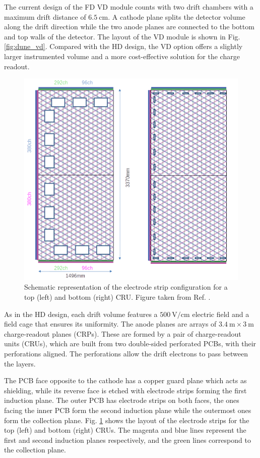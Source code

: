 The current design of the FD VD module counts with two drift chambers with a maximum drift distance of $6.5~\mathrm{cm}$. A cathode plane splits the detector volume along the drift direction while the two anode planes are connected to the bottom and top walls of the detector. The layout of the VD module is shown in Fig. \ref{fig:dune_vd}. Compared with the HD design, the VD option offers a slightly larger instrumented volume and a more cost-effective solution for the charge readout.

\begin{figure}[t]
	\centering
	\includegraphics[width=0.70\linewidth]{Images/DUNE/FD/3V_anode_layout}
	\caption[Schematic representation of the electrode strip configuration for a top and bottom CRU.]{Schematic representation of the electrode strip configuration for a top (left) and bottom (right) CRU. Figure taken from Ref. \cite{DUNEVDTDR}.}
	\label{fig:dune_cru}
\end{figure}

As in the HD design, each drift volume features a $500~\mathrm{V/cm}$ electric field and a field cage that ensures its uniformity. The anode planes are arrays of $3.4~\mathrm{m}\times3~\mathrm{m}$ charge-readout planes (CRPs). These are formed by a pair of charge-readout units (CRUs), which are built from two double-sided perforated PCBs, with their perforations aligned. The perforations allow the drift electrons to pass between the layers.

The PCB face opposite to the cathode has a copper guard plane which acts as shielding, while its reverse face is etched with electrode strips forming the first induction plane. The outer PCB has electrode strips on both faces, the ones facing the inner PCB form the second induction plane while the outermost ones form the collection plane. Fig. \ref{fig:dune_cru} shows the layout of the electrode strips for the top (left) and bottom (right) CRUs. The magenta and blue lines represent the first and second induction planes respectively, and the green lines correspond to the collection plane.


